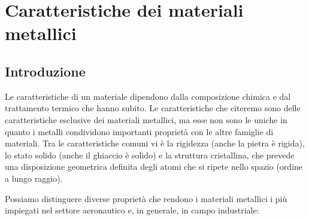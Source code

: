 \setchapterpreamble[u]{\margintoc}
\chapter{Caratteristiche dei materiali metallici}

\section{Introduzione}
Le caratteristiche di un materiale dipendono dalla composizione chimica e dal trattamento termico
che hanno subito.
Le caratteristiche che citeremo sono delle caratteristiche esclusive dei materiali metallici, ma esse non sono le uniche in quanto i metalli condividono importanti proprietà con le altre famiglie di materiali. Tra le caratteristiche comuni vi è la rigidezza (anche la pietra è rigida), lo stato solido (anche il ghiaccio è solido) e la struttura cristallina, che prevede una disposizione geometrica definita degli atomi che si ripete nello spazio (ordine a lungo raggio).

Possiamo distinguere diverse proprietà che rendono i materiali metallici i più impiegati nel settore aeronautico e, in generale, in campo industriale:

